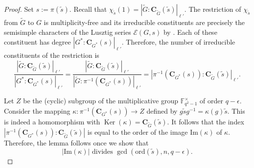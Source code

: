 \documentclass[12pt]{amsart}
\theoremstyle{definition}
\numberwithin{equation}{section}
\newcommand{\Ker}{\operatorname{Ker}}
\newcommand{\ord}{{\mathrm {ord}}}
\renewcommand{\Im}{{\mathrm {Im}}}
\newcommand{\FF}{{\mathbb F}}
\newcommand{\EC}{\mathcal{E}}
\newcommand{\bC}{{\mathbf{C}}}
\begin{document}
\begin{proof}
Set $s:=\pi(\widetilde{s})$. Recall that
$\chi_{\widetilde{s}}(1)=|\widetilde{G}:\bC_{\widetilde{G}}(\widetilde{s})|_{\ell'}$.
The restriction of $\chi_{\widetilde{s}}$ from $\widetilde{G}$ to
$G$ is multiplicity-free and its irreducible constituents are
precisely the semisimple characters of the Lusztig series
\(\EC(G,s)\) by \cite[Corollary~2.6.18]{GeckMalle}. Each of these
constituent has degree $|G^* : \bC_{G^*}(s)|_{\ell'}$. Therefore,
the number of irreducible constituents of the restriction %
is
\[
\frac{|\widetilde{G}:\bC_{\widetilde{G}}(\widetilde{s})|_{\ell'}}{|G^*
:
\bC_{G^*}(s)|_{\ell'}}=\frac{|\widetilde{G}:\bC_{\widetilde{G}}(\widetilde{s})|_{\ell'}}{|\widetilde{G}
:
\pi^{-1}(\bC_{G^*}(s))|_{\ell'}}=|\pi^{-1}(\bC_{G^*}(s)):\bC_{\widetilde{G}}(\widetilde{s})|_{\ell'}.
\]




Let %
$Z$ be the (cyclic) subgroup of the multiplicative group
$\FF_{q^2-1}^\times$ of order $q-\epsilon$. Consider the mapping
$\kappa: \pi^{-1}(\bC_{G^*}(s))\to Z$ defined by %
$g\widetilde{s}g^{-1}=\kappa(g)\widetilde{s}$. This is indeed a
homomorphism with $\Ker(\kappa)=\bC_{\widetilde{G}}(\widetilde{s})$.
It follows that the index
$|\pi^{-1}(\bC_{G^*}(s)):\bC_{\widetilde{G}}(\widetilde{s})|$ is
equal to the order of the image $\Im(\kappa)$ of $\kappa$.
Therefore, the lemma follows once we show %
that
\[
|\Im(\kappa)| \text{ divides }
\gcd(\ord(\widetilde{s}),n,q-\epsilon).
\]



\end{proof}
\end{document}
